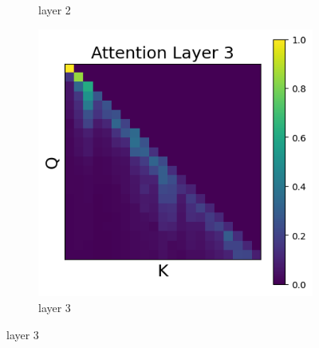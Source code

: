 \documentclass[11pt]{article}
\begin{document}
\begin{figure}[t]
\begin{subfigure}[t]{0.24\textwidth}
    \caption{layer 2}
  \end{subfigure}\hfill
  \begin{subfigure}[t]{0.24\textwidth}
    \centering
    \includegraphics[width=1.4\columnwidth]{figures/intervention2/layer_3.png}
    \caption{layer 3}
  \end{subfigure}\hfill


\end{figure}
\end{document}
